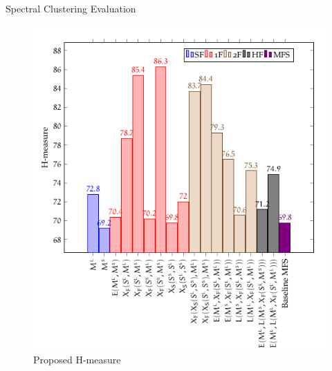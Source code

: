 \documentclass[10pt,xcolor=table]{beamer}
\begin{document}
\begin{frame}{Spectral Clustering Evaluation}
\begin{figure}
	\centering
	\includegraphics[width=.6\linewidth]{image2/Chapitre4/wsd_SC_Hm.png}
	\caption{Proposed H-measure}
\end{figure}
\end{frame}
\end{document}
